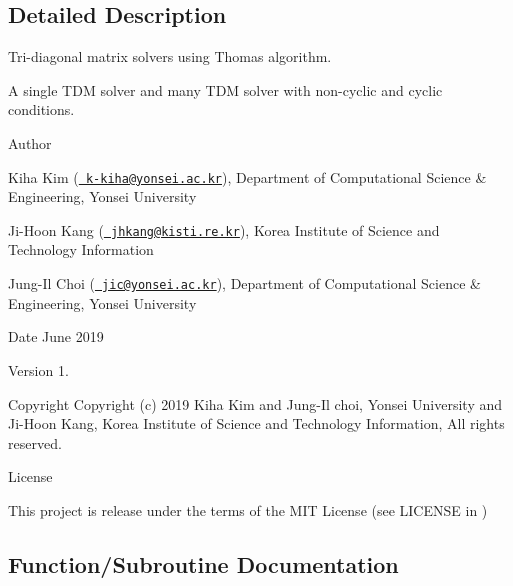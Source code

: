 \subsection{Detailed Description}
Tri-\/diagonal matrix solvers using Thomas algorithm. 

A single T\+DM solver and many T\+DM solver with non-\/cyclic and cyclic conditions. \begin{DoxyAuthor}{Author}

\end{DoxyAuthor}

\begin{DoxyItemize}
\item Kiha Kim (\href{mailto:k-kiha@yonsei.ac.kr}{\texttt{ k-\/kiha@yonsei.\+ac.\+kr}}), Department of Computational Science \& Engineering, Yonsei University
\item Ji-\/\+Hoon Kang (\href{mailto:jhkang@kisti.re.kr}{\texttt{ jhkang@kisti.\+re.\+kr}}), Korea Institute of Science and Technology Information
\item Jung-\/\+Il Choi (\href{mailto:jic@yonsei.ac.kr}{\texttt{ jic@yonsei.\+ac.\+kr}}), Department of Computational Science \& Engineering, Yonsei University
\end{DoxyItemize}

\begin{DoxyDate}{Date}
June 2019 
\end{DoxyDate}
\begin{DoxyVersion}{Version}
1. 
\end{DoxyVersion}
\begin{DoxyParagraph}{Copyright}
Copyright (c) 2019 Kiha Kim and Jung-\/\+Il choi, Yonsei University and Ji-\/\+Hoon Kang, Korea Institute of Science and Technology Information, All rights reserved. 
\end{DoxyParagraph}
\begin{DoxyParagraph}{License }

\end{DoxyParagraph}
This project is release under the terms of the M\+IT License (see L\+I\+C\+E\+N\+SE in ) 

\subsection{Function/\+Subroutine Documentation}
\mbox{\label{tdmas_8f90_a6c50d548eaa4b5e9b96ccbf8f65cb12a}} 
